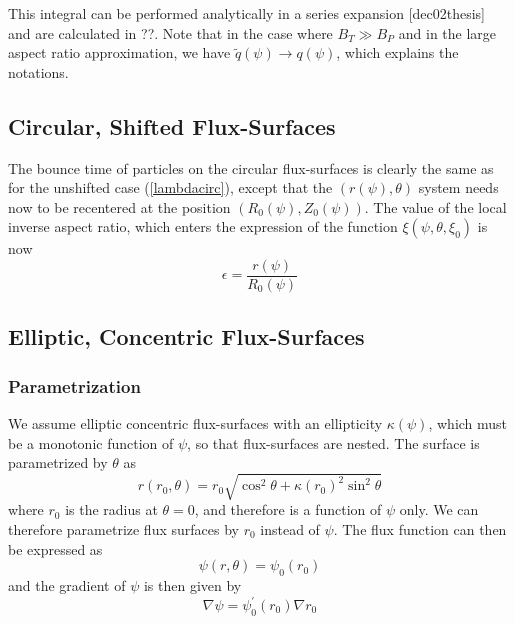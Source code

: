 \documentclass{article}
\begin{document}
This integral can be performed analytically in a series expansion
[dec02thesis] and are calculated in ??. Note that in the case where $%
B_{T}\gg B_{P}$ and in the large aspect ratio approximation, we have $%
\widetilde{q}\left( \psi \right) \rightarrow q\left( \psi \right) $, which
explains the notations.

\subsection{Circular, Shifted Flux-Surfaces}

The bounce time of particles on the circular flux-surfaces is clearly the
same as for the unshifted case (\ref{lambdacirc}), except that the $\left(
r\left( \psi \right) ,\theta \right) $ system needs now to be recentered at
the position $\left( R_{0}\left( \psi \right) ,Z_{0}\left( \psi \right)
\right) $. The value of the local inverse aspect ratio, which enters the
expression of the function $\xi \left( \psi ,\theta ,\xi _{0}\right) $ is
now 
\begin{equation}
\epsilon =\frac{r\left( \psi \right) }{R_{0}\left( \psi \right) }
\end{equation}

\subsection{Elliptic, Concentric Flux-Surfaces}

\subsubsection{Parametrization}

We assume elliptic concentric flux-surfaces with an ellipticity $\kappa
\left( \psi \right) $, which must be a monotonic function of $\psi $, so
that flux-surfaces are nested. The surface is parametrized by $\theta $ as
\begin{equation}
r\left( r_{0},\theta \right) =r_{0}\sqrt{\cos ^{2}\theta +\kappa \left(
r_{0}\right) ^{2}\sin ^{2}\theta }  \label{rellip}
\end{equation}
where $r_{0}$ is the radius at $\theta =0$, and therefore is a function of $%
\psi $ only. We can therefore parametrize flux surfaces by $r_{0}$ instead
of $\psi $. The flux function can then be expressed as
\begin{equation}
\psi \left( r,\theta \right) =\psi _{0}\left( r_{0}\right) 
\end{equation}
and the gradient of $\psi $ is then given by
\begin{equation}
\nabla \psi =\psi _{0}^{\prime }\left( r_{0}\right) \nabla r_{0}
\end{equation}
\end{document}
